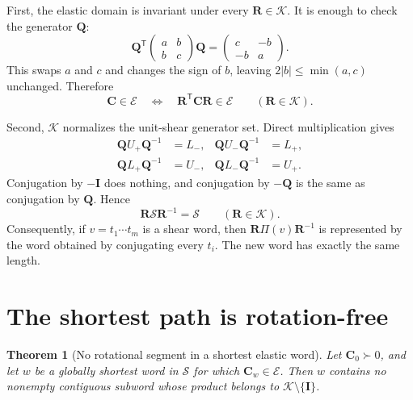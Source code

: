 \documentclass[11pt]{article}
\newcommand{\trans}{\mathsf{T}}
\newcommand{\E}{\mathcal E}
\newcommand{\K}{\mathcal K}
\newcommand{\Sset}{\mathcal S}
\newcommand{\wordprod}{\Pi}
\newcommand{\Uplus}{U_{+}}
\newcommand{\Uminus}{U_{-}}
\newcommand{\Lplus}{L_{+}}
\newcommand{\Lminus}{L_{-}}
\newtheorem{theorem}{Theorem}
\theoremstyle{definition}
\begin{document}
First, the elastic domain is invariant under every \(\mathbf R\in\K\).  It
is enough to check the generator \(\mathbf Q\):
\begin{equation}
 \mathbf Q^\trans
 \begin{pmatrix}a&b\\b&c\end{pmatrix}
 \mathbf Q
 =\begin{pmatrix}c&-b\\-b&a\end{pmatrix}.
 \label{eq:domaininvariance}
\end{equation}
This swaps \(a\) and \(c\) and changes the sign of \(b\), leaving
\(2|b|\leq\min(a,c)\) unchanged.  Therefore
\begin{equation}
 \mathbf C\in\E
 \quad\Longleftrightarrow\quad
 \mathbf R^\trans\mathbf C\mathbf R\in\E
 \qquad(\mathbf R\in\K).
 \label{eq:Einvariant}
\end{equation}

Second, \(\K\) normalizes the unit-shear generator set.  Direct multiplication
gives
\begin{equation}
 \begin{aligned}
 \mathbf Q\Uplus\mathbf Q^{-1}&=\Lminus,&
 \mathbf Q\Uminus\mathbf Q^{-1}&=\Lplus,\\
 \mathbf Q\Lplus\mathbf Q^{-1}&=\Uminus,&
 \mathbf Q\Lminus\mathbf Q^{-1}&=\Uplus.
 \end{aligned}
 \label{eq:conjugation}
\end{equation}
Conjugation by \(-\mathbf I\) does nothing, and conjugation by
\(-\mathbf Q\) is the same as conjugation by \(\mathbf Q\).  Hence
\begin{equation}
 \mathbf R\Sset\mathbf R^{-1}=\Sset
 \qquad(\mathbf R\in\K).
 \label{eq:normalizes}
\end{equation}
Consequently, if \(v=t_1\cdots t_m\) is a shear word, then
\(\mathbf R\wordprod(v)\mathbf R^{-1}\) is represented by the word obtained
by conjugating every \(t_i\).  The new word has exactly the same length.

\section{The shortest path is rotation-free}

\begin{theorem}[No rotational segment in a shortest elastic word]
Let \(\mathbf C_0\succ0\), and let \(w\) be a globally shortest word in
\(\Sset\) for which \(\mathbf C_w\in\E\).  Then \(w\) contains no nonempty
contiguous subword whose product belongs to
\(\K\setminus\{\mathbf I\}\).
\label{thm:main}
\end{theorem}
\end{document}
